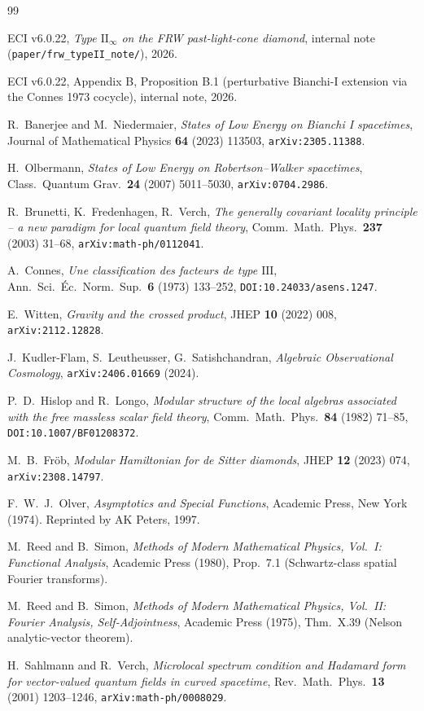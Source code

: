 \documentclass[11pt,a4paper]{article}
\theoremstyle{definition}
\begin{document}

\begin{thebibliography}{99}

 ECI v6.0.22, \emph{Type $\mathrm{II}_\infty$ on the
FRW past-light-cone diamond}, internal note (\texttt{paper/frw\_typeII\_note/}),
2026.

 ECI v6.0.22, Appendix B, Proposition B.1 (perturbative
Bianchi-I extension via the Connes 1973 cocycle), internal note, 2026.

 R.~Banerjee and M.~Niedermaier, \emph{States of Low Energy on
Bianchi I spacetimes}, Journal of Mathematical Physics \textbf{64} (2023)
113503, \texttt{arXiv:2305.11388}.

 H.~Olbermann, \emph{States of Low Energy on
Robertson--Walker spacetimes}, Class.\ Quantum Grav.\ \textbf{24} (2007)
5011--5030, \texttt{arXiv:0704.2986}.

 R.~Brunetti, K.~Fredenhagen, R.~Verch, \emph{The generally
covariant locality principle -- a new paradigm for local quantum field
theory}, Comm.\ Math.\ Phys.\ \textbf{237} (2003) 31--68,
\texttt{arXiv:math-ph/0112041}.

 A.~Connes, \emph{Une classification des facteurs de
type $\mathrm{III}$}, Ann.\ Sci.\ \'Ec.\ Norm.\ Sup.\ \textbf{6} (1973)
133--252, \texttt{DOI:10.24033/asens.1247}.

 E.~Witten, \emph{Gravity and the crossed product},
JHEP \textbf{10} (2022) 008, \texttt{arXiv:2112.12828}.

 J.~Kudler-Flam, S.~Leutheusser, G.~Satishchandran,
\emph{Algebraic Observational Cosmology}, \texttt{arXiv:2406.01669} (2024).

 P.~D.~Hislop and R.~Longo, \emph{Modular structure
of the local algebras associated with the free massless scalar field
theory}, Comm.\ Math.\ Phys.\ \textbf{84} (1982) 71--85,
\texttt{DOI:10.1007/BF01208372}.

 M.~B.~Fr\"ob, \emph{Modular Hamiltonian for de Sitter
diamonds}, JHEP \textbf{12} (2023) 074, \texttt{arXiv:2308.14797}.

 F.~W.~J.~Olver, \emph{Asymptotics and Special
Functions}, Academic Press, New York (1974). Reprinted by AK Peters,
1997.

 M.~Reed and B.~Simon, \emph{Methods of Modern
Mathematical Physics, Vol.~I: Functional Analysis}, Academic Press
(1980), Prop.~7.1 (Schwartz-class spatial Fourier transforms).

 M.~Reed and B.~Simon, \emph{Methods of Modern
Mathematical Physics, Vol.~II: Fourier Analysis, Self-Adjointness},
Academic Press (1975), Thm.~X.39 (Nelson analytic-vector theorem).

 H.~Sahlmann and R.~Verch, \emph{Microlocal
spectrum condition and Hadamard form for vector-valued quantum fields
in curved spacetime}, Rev.\ Math.\ Phys.\ \textbf{13} (2001) 1203--1246,
\texttt{arXiv:math-ph/0008029}.

\end{thebibliography}
\end{document}
